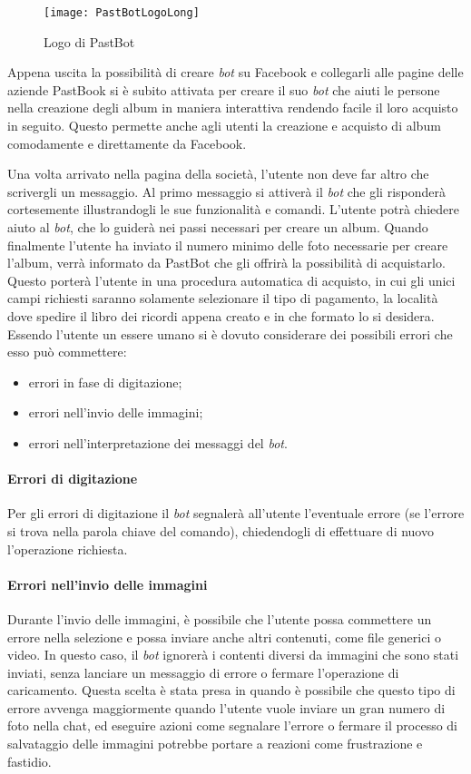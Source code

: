 \begin{figure}[H]
  \centering
  \texttt{[image: PastBotLogoLong]}
  \caption{Logo di PastBot}
\end{figure}
Appena uscita la possibilità di creare \textit{bot} su Facebook e collegarli
alle pagine delle aziende PastBook si è subito attivata per creare il suo
\textit{bot} che aiuti le persone nella creazione degli album in maniera
interattiva rendendo facile il loro acquisto in seguito. Questo permette anche
agli utenti la creazione e acquisto di album comodamente e direttamente da
Facebook.

Una volta arrivato nella pagina della società, l'utente non deve far altro che
scrivergli un messaggio. Al primo messaggio si attiverà il \textit{bot} che
gli risponderà cortesemente illustrandogli le sue funzionalità e comandi.
L'utente potrà chiedere aiuto al \textit{bot}, che lo guiderà nei passi
necessari per creare un album. Quando finalmente l'utente ha inviato il numero
minimo delle foto necessarie per creare l'album, verrà informato da PastBot che
gli offrirà la possibilità di acquistarlo. Questo porterà l'utente in una
procedura automatica di acquisto, in cui gli unici campi richiesti saranno
solamente selezionare il tipo di pagamento, la località dove spedire il libro
dei ricordi appena creato e in che formato lo si desidera. \\

Essendo l'utente un essere umano si è dovuto considerare dei possibili errori
che esso può commettere:
\begin{itemize}
  \item errori in fase di digitazione;
  \item errori nell'invio delle immagini;
  \item errori nell'interpretazione dei messaggi del \textit{bot}.
\end{itemize}

\paragraph*{Errori di digitazione} Per gli errori di digitazione il \textit{bot}
segnalerà all'utente l'eventuale errore (se l'errore si trova nella parola
chiave del comando), chiedendogli di effettuare di nuovo l'operazione richiesta.

\paragraph*{Errori nell'invio delle immagini} Durante l'invio delle immagini, è
possibile che l'utente possa commettere un errore nella selezione e possa
inviare anche altri contenuti, come file generici o video. In questo caso, il
\textit{bot} ignorerà i contenti diversi da immagini che sono stati inviati,
senza lanciare un messaggio di errore o fermare l'operazione di caricamento.
Questa scelta è stata presa in quando è possibile che questo tipo di errore
avvenga maggiormente quando l'utente vuole inviare un gran numero di foto nella
chat, ed eseguire azioni come segnalare l'errore o fermare il processo di
salvataggio delle immagini potrebbe portare a reazioni come frustrazione e
fastidio.

